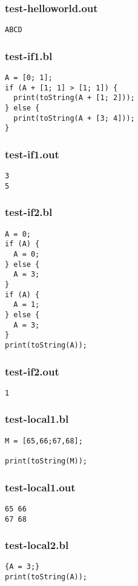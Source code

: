 \subsubsection{test-helloworld.out}
\begin{lstlisting}
ABCD\end{lstlisting}
\subsubsection{test-if1.bl}
\begin{lstlisting}
A = [0; 1];
if (A + [1; 1] > [1; 1]) {
  print(toString(A + [1; 2]));
} else {
  print(toString(A + [3; 4]));
}\end{lstlisting}
\subsubsection{test-if1.out}
\begin{lstlisting}
3
5\end{lstlisting}
\subsubsection{test-if2.bl}
\begin{lstlisting}
A = 0;
if (A) {
  A = 0;
} else {
  A = 3;
}
if (A) {
  A = 1;
} else {
  A = 3;
}
print(toString(A));
\end{lstlisting}
\subsubsection{test-if2.out}
\begin{lstlisting}
1\end{lstlisting}
\subsubsection{test-local1.bl}
\begin{lstlisting}
M = [65,66;67,68];

print(toString(M));
\end{lstlisting}
\subsubsection{test-local1.out}
\begin{lstlisting}
65 66
67 68\end{lstlisting}
\subsubsection{test-local2.bl}
\begin{lstlisting}
{A = 3;}
print(toString(A));
\end{lstlisting}
